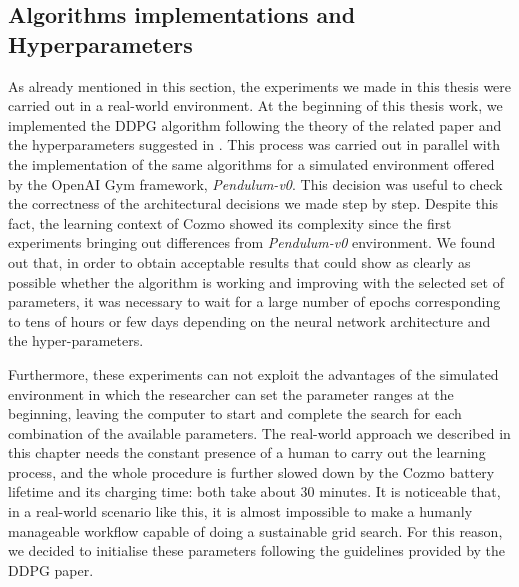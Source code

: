 \subsection{Algorithms implementations and Hyperparameters}

As already mentioned in this section, the experiments we made in this thesis were carried out in a real-world environment.
At the beginning of this thesis work, we implemented the DDPG algorithm following the theory of the related paper and the hyperparameters suggested in \cite{lillicrap2015continuous,kendall2018learning,kendall2019learning}.
This process was carried out in parallel with the implementation of the same algorithms for a simulated environment offered by the OpenAI Gym framework, \textit{Pendulum-v0}.
This decision was useful to check the correctness of the architectural decisions we made step by step.
Despite this fact, the learning context of Cozmo showed its complexity since the first experiments bringing out differences from \textit{Pendulum-v0} environment.
We found out that, in order to obtain acceptable results that could show as clearly as possible whether the algorithm is working and improving with the selected set of parameters, it was necessary to wait for a large number of epochs corresponding to tens of hours or few days depending on the neural network architecture and the hyper-parameters.

Furthermore, these experiments can not exploit the advantages of the simulated environment in which the researcher can set the parameter ranges at the beginning, leaving the computer to start and complete the search for each combination of the available parameters.
The real-world approach we described in this chapter needs the constant presence of a human to carry out the learning process, and the whole procedure is further slowed down by the Cozmo battery lifetime and its charging time: both take about 30 minutes.
It is noticeable that, in a real-world scenario like this, it is almost impossible to make a humanly manageable workflow capable of doing a sustainable grid search.
For this reason, we decided to initialise these parameters following the guidelines provided by the DDPG paper.

